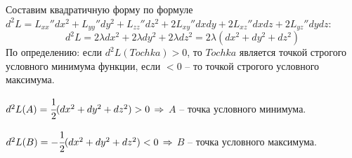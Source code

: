 \documentclass[12pt]{report}
\begin{document}
Составим квадратичную форму по формуле $d^2L=L_{xx}''dx^2+L_{yy}''dy^2+L_{zz}''dz^2+2L_{xy}''dxdy+2L_{xz}''dxdz+2L_{yz}''dydz $:
$$ d^2L=2\lambda dx^2+2\lambda dy^2 + 2\lambda dz^2=2\lambda(dx^2+dy^2+dz^2) $$
По определению: если $d^2L(Tochka)>0$, то $Tochka$ является точкой строгого условного минимума функции, если $<0$ -- то точкой строгого условного максимума.

$d^2L(A)=\cfrac{1}{2}(dx^2+dy^2+dz^2)>0\,\Rightarrow$ $A$ -- точка условного минимума.

$d^2L(B)=-\cfrac{1}{2}(dx^2+dy^2+dz^2)<0\,\Rightarrow$ $B$ -- точка условного максимума.
\end{document}
